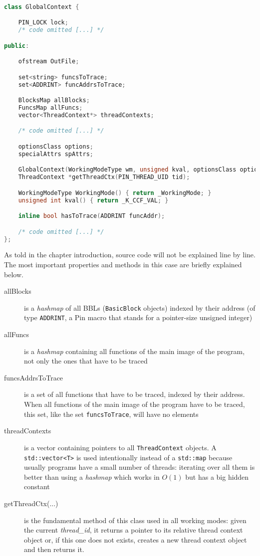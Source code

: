 \documentclass[a4paper,10pt]{report}
\begin{document}
\begin{lstlisting}[language=C++,
	caption={partial definition of \texttt{GlobalContext}}, label=globalCtx, frame=leftline]

class GlobalContext {

	PIN_LOCK lock;
	/* code omitted [...] */

public:

	ofstream OutFile;

	set<string> funcsToTrace;
	set<ADDRINT> funcAddrsToTrace;

	BlocksMap allBlocks;
	FuncsMap allFuncs;
	vector<ThreadContext*> threadContexts;

	/* code omitted [...] */

	optionsClass options;
	specialAttrs spAttrs;

	GlobalContext(WorkingModeType wm, unsigned kval, optionsClass options);
	ThreadContext *getThreadCtx(PIN_THREAD_UID tid);

	WorkingModeType WorkingMode() { return _WorkingMode; }
	unsigned int kval() { return _K_CCF_VAL; }

	inline bool hasToTrace(ADDRINT funcAddr);

	/* code omitted [...] */
};

\end{lstlisting}

\noindent
As told in the chapter introduction, source code will not be explained line by line.
The most important properties and methods in this case are briefly explained below.
\begin{description}
\item[allBlocks] is a \emph{hashmap} of all BBLs (\verb|BasicBlock| objects) indexed by their address (of type \verb|ADDRINT|, a Pin macro that stands for a pointer-size unsigned integer)
\item[allFuncs] is a \emph{hashmap} containing all functions of the main image of the
program, not only the ones that have to be traced
\item[funcsAddrsToTrace] is a set of all functions that have to be traced, indexed
by their address. When all functions of the main image of the program have to be traced,
this set, like the set \verb|funcsToTrace|, will have no elements
\item[threadContexts] is a vector containing pointers to all \verb|ThreadContext| objects. A \verb|std::vector<T>| is used intentionally instead of a \verb|std::map| because
usually programs have a small number of threads: iterating over all them is better than using a \emph{hashmap} which works in $O(1)$ but has a big hidden constant
\item[getThreadCtx(...)] is the fundamental method of this class used in all working modes:
given the current \emph{thread\_id}, it returns a pointer to its relative thread context object or, if this one does not exists, creates a new thread context object and then returns it.
\end{description}
\end{document}
